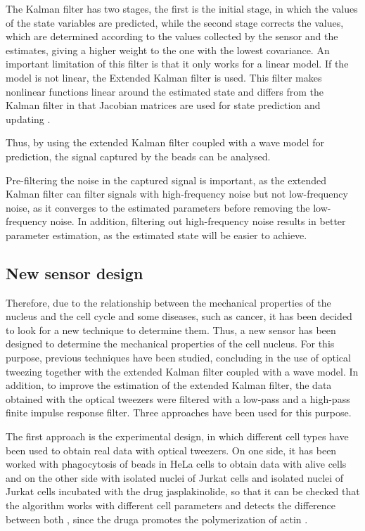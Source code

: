 \documentclass[12pt, a4paper]{article} %
\begin{document}
The Kalman filter has two stages, the first is the initial stage, in which the values of the state variables are predicted, while the second stage corrects the values, which are determined according to the values collected by the sensor and the estimates, giving a higher weight to the one with the lowest covariance. An important limitation of this filter is that it only works for a linear model. If the model is not linear, the Extended Kalman filter is used. This filter makes nonlinear functions linear around the estimated state and differs from the Kalman filter in that Jacobian matrices are used for state prediction and updating \cite{ribeiro2004Kalman}.

Thus, by using the extended Kalman filter coupled with a wave model for prediction, the signal captured by the beads can be analysed.

Pre-filtering the noise in the captured signal is important, as the extended Kalman filter can filter signals with high-frequency noise but not low-frequency noise, as it converges to the estimated parameters before removing the low-frequency noise. In addition, filtering out high-frequency noise results in better parameter estimation, as the estimated state will be easier to achieve.

\setlength{\parskip}{0mm}

\subsection{New sensor design}

Therefore, due to the relationship between the mechanical properties of the nucleus and the cell cycle and some diseases, such as cancer, it has been decided to look for a new technique to determine them. Thus, a new sensor has been designed to determine the mechanical properties of the cell nucleus. For this purpose, previous techniques have been studied, concluding in the use of optical tweezing together with the extended Kalman filter coupled with a wave model. In addition, to improve the estimation of the extended Kalman filter, the data obtained with the optical tweezers were filtered with a low-pass and a high-pass finite impulse response filter. Three approaches have been used for this purpose.
 
\setlength{\parskip}{4mm}

The first approach is the experimental design, in which different cell types have been used to obtain real data with optical tweezers. On one side, it has been worked with phagocytosis of beads in HeLa cells \cite{gey1952tissue} to obtain data with alive cells and on the other side with isolated nuclei of Jurkat cells \cite{schneider1977characterization, gioia2018genome} and isolated nuclei of Jurkat cells incubated with the drug jasplakinolide, so that it can be checked that the algorithm works with different cell parameters and detects the difference between both \cite{andersen2002directed}, since the druga promotes the polymerization  of actin \cite{holzinger2001jasplakinolide}.
\end{document}
